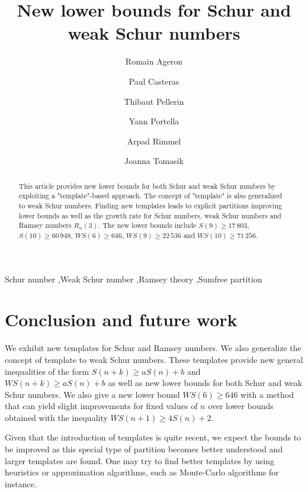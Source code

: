 \documentclass[3p]{elsarticle}
\title{New lower bounds for Schur and weak Schur numbers}
\author[1]{Romain Ageron\fnref{fn1}}
\author[1]{Paul Casteras\fnref{fn1}}
\author[1]{Thibaut Pellerin\fnref{fn1}}
\author[1]{Yann Portella\fnref{fn1}}
\author[2]{Arpad Rimmel\fnref{fn2}}
\author[2]{Joanna Tomasik\corref{cor1}\fnref{fn2}}
\newtheorem{computational theorem}[definition]{Computational Theorem}
\newcommand{\WS}{\mathit{WS}}
\begin{document}
\begin{abstract}

This article provides new lower bounds for both Schur and weak Schur numbers by exploiting a "template"-based approach. 
The concept of "template" is also generalized to weak Schur numbers. Finding new templates leads to explicit partitions 
improving lower bounds as well as the growth rate for Schur numbers, weak Schur numbers and Ramsey numbers \(R_n(3)\). 
The new lower bounds include \(S(9) \geqslant 17\,803\), \(S(10) \geqslant 60\,948\), \(\WS(6) \geqslant 646\), 
\(\WS (9) \geqslant 22\,536\) and \(\WS (10) \geqslant 71\,256 \).

\end{abstract}

\begin{keyword}
Schur number \sep Weak Schur number \sep Ramsey theory \sep Sumfree partition
\end{keyword}

\maketitle







\section{Conclusion and future work}

We exhibit new templates for Schur and Ramsey numbers. We also generalize the concept of template to weak Schur numbers. 
These templates provide new general inequalities of the form \(S(n+k) \geqslant a S(n) + b\) and \(\WS(n+k) \geqslant a S(n) + b\) 
as well as new lower bounds for both Schur and weak Schur numbers. We also give a new lower bound \(\WS(6) \geqslant 646\) with 
a method that can yield slight improvements for fixed values of \(n\) over lower bounds obtained with the inequality 
\(\WS(n+1) \geqslant 4 S(n) + 2\).

Given that the introduction of templates is quite recent, we expect the bounds to be improved as this special type of partition 
becomes better understood and larger templates are found. One may try to find better templates by using heuristics or 
approximation algorithms, such as Monte-Carlo algorithms for instance.
\end{document}
